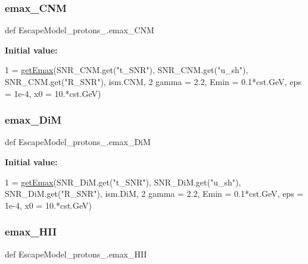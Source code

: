 \subsubsection{\texorpdfstring{emax\+\_\+\+C\+NM}{emax\_CNM}}
{\footnotesize\ttfamily def Escape\+Model\+\_\+protons\+\_.\+emax\+\_\+\+C\+NM}

{\bfseries Initial value\+:}
\begin{DoxyCode}
1 =  \hyperlink{namespaceEscapeModel__protons__2_a178d4eb6e1bea7a052df9bc9680f3af4}{getEmax}(SNR\_CNM.get(\textcolor{stringliteral}{"t\_SNR"}), SNR\_CNM.get(\textcolor{stringliteral}{"u\_sh"}), SNR\_CNM.get(\textcolor{stringliteral}{"R\_SNR"}), ism.CNM, 
2                    gamma = 2.2, Emin = 0.1*cst.GeV, eps = 1e-4, x0 = 10.*cst.GeV)
\end{DoxyCode}
\mbox{\label{namespaceEscapeModel__protons__2_a22e070917067210d2d15b8c6d19f3d94}} 
\subsubsection{\texorpdfstring{emax\+\_\+\+DiM}{emax\_DiM}}
{\footnotesize\ttfamily def Escape\+Model\+\_\+protons\+\_.\+emax\+\_\+\+DiM}

{\bfseries Initial value\+:}
\begin{DoxyCode}
1 =  \hyperlink{namespaceEscapeModel__protons__2_a178d4eb6e1bea7a052df9bc9680f3af4}{getEmax}(SNR\_DiM.get(\textcolor{stringliteral}{"t\_SNR"}), SNR\_DiM.get(\textcolor{stringliteral}{"u\_sh"}), SNR\_DiM.get(\textcolor{stringliteral}{"R\_SNR"}), ism.DiM, 
2                    gamma = 2.2, Emin = 0.1*cst.GeV, eps = 1e-4, x0 = 10.*cst.GeV)
\end{DoxyCode}
\mbox{\label{namespaceEscapeModel__protons__2_a9b7a339d62cd28fa48569b3e78d15dbd}} 
\subsubsection{\texorpdfstring{emax\+\_\+\+H\+II}{emax\_HII}}
{\footnotesize\ttfamily def Escape\+Model\+\_\+protons\+\_.\+emax\+\_\+\+H\+II}

